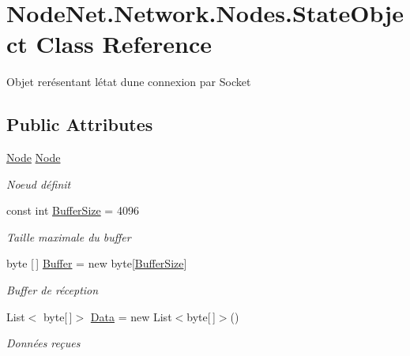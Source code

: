 \hypertarget{class_node_net_1_1_network_1_1_nodes_1_1_state_object}{}\section{Node\+Net.\+Network.\+Nodes.\+State\+Object Class Reference}
\label{class_node_net_1_1_network_1_1_nodes_1_1_state_object}


Objet rerésentant l\textquotesingle{}état d\textquotesingle{}une connexion par Socket  


\subsection*{Public Attributes}
\begin{DoxyCompactItemize}
\item 
\hyperlink{class_node_net_1_1_network_1_1_nodes_1_1_node}{Node} \hyperlink{class_node_net_1_1_network_1_1_nodes_1_1_state_object_a40fa1f5f19ed68d0f90ea2ea6e393dc5}{Node}
\begin{DoxyCompactList}\small\item\em Noeud définit \end{DoxyCompactList}\item 
const int \hyperlink{class_node_net_1_1_network_1_1_nodes_1_1_state_object_ae9da1e8df82c52f1e9d4bf28f1367c92}{Buffer\+Size} = 4096
\begin{DoxyCompactList}\small\item\em Taille maximale du buffer \end{DoxyCompactList}\item 
byte \mbox{[}$\,$\mbox{]} \hyperlink{class_node_net_1_1_network_1_1_nodes_1_1_state_object_a70d9017620e0ee8447da25de9b6fccc1}{Buffer} = new byte\mbox{[}\hyperlink{class_node_net_1_1_network_1_1_nodes_1_1_state_object_ae9da1e8df82c52f1e9d4bf28f1367c92}{Buffer\+Size}\mbox{]}
\begin{DoxyCompactList}\small\item\em Buffer de réception \end{DoxyCompactList}\item 
List$<$ byte\mbox{[}$\,$\mbox{]}$>$ \hyperlink{class_node_net_1_1_network_1_1_nodes_1_1_state_object_a62f688bd7e704d4c0fc4a59511386fba}{Data} = new List$<$byte\mbox{[}$\,$\mbox{]}$>$()
\begin{DoxyCompactList}\small\item\em Données reçues \end{DoxyCompactList}\end{DoxyCompactItemize}


